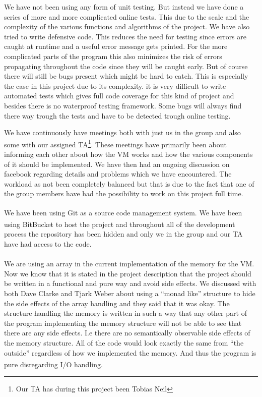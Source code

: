 \documentclass{article}
\begin{document}
We have not been using any form of unit testing. But instead we have done a
series of more and more complicated online tests. This due to the scale and the
complexity of the various functions and algorithms of the project. We have also
tried to write defensive code. This reduces the need for testing since errors
are caught at runtime and a useful error message gets printed. For the more
complicated parts of the program this also minimizes the risk of errors
propagating throughout the code since they will be caught early. But of course
there will still be bugs present which might be hard to catch. This is
especially the case in this project due to its complexity. it is very difficult
to write automated tests which gives full code coverage for this kind of project
and besides there is no waterproof testing framework. Some bugs will always
find there way trough the tests and have to be detected trough online testing.

We have continuously have meetings both with just us in the group and also some
with our assigned TA\footnote{Our TA has during this project been Tobias Neil}.
These meetings have primarily been about informing each other about how the
VM works and how the various components of it should be
implemented. We have then had an ongoing discussion on facebook regarding
details and problems which we have encountered. The workload as not been
completely balanced but that is due to the fact that one of the group members
have had the possibility to work on this project full time.

We have been using Git\textsuperscript{\cite{git}} as a source code management
system. We have been using BitBucket\textsuperscript{\cite{bitbucket}} to
host the project and throughout all of the development process the repository has
been hidden and only we in the group and our TA have had access to the code.\\
\\
We are using an array in the current implementation of the memory for the VM.
Now we know that it is stated in the project description that the project should
be written in a functional and pure way and avoid side effects. We discussed
with both Dave Clarke and Tjark Weber about using a ``monad like'' structure
to hide the side effects of the array handling and they said that it was okay.
The structure handling the memory is written in such a way that any other part
of the program implementing the memory structure will not be able to see that there
are any side effects. I.e there are no semantically observable side effects of
the memory structure. All of the code would look exactly the same from ``the
outside'' regardless of how we implemented the memory. And thus the program is
pure\textsuperscript{\cite{pure}} disregarding I/O handling.
\end{document}

